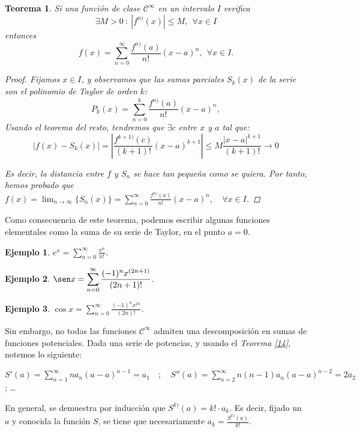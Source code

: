 \documentclass[11pt, a4paper]{article}
\theoremstyle{theorem-style}
\newtheorem{nth}{Teorema}[section]
\theoremstyle{definition-style}
\theoremstyle{remark-style}
\theoremstyle{example-style}
\newtheorem{ejemplo}{Ejemplo}[section]
\begin{document}
\begin{nth} \label{15}
Si una funci\'on de clase $\mathcal{C}^\infty$ en un intervalo $I$ verifica 
\[
\exists M>0 \ : \  |f^{n)}(x)|\leq M, \ \ \forall x\in I
\]
entonces 
\[
f(x) = \sum_{n=0}^\infty \frac{f^{n)} (a)}{n!} (x-a)^n , \ \ \forall x\in I.
\]

\begin{proof}
	Fijamos $x \in I$, y observamos que las sumas parciales $S_k(x)$ de la serie son el polinomio de Taylor de orden $k$: 
\[
P_k(x) =  \sum_{n=0}^k \frac{f^{n)} (a)}{n!} (x-a)^n,
\]
Usando el teorema del resto, tendremos que $\exists c$ entre $x$ y $a$ tal que:
\[
|f(x)-S_k(x)| =\left| \frac{ f^{k+1)} (c)}{(k+1)!} (x-a)^{k+1}\right| \leq  M \frac{|x-a|^{k+1}}{(k+1)!} \to 0
\]

Es decir, la distancia entre $f$ y $S_n$ se hace tan pequeña como se quiera. Por tanto, hemos probado que $\displaystyle f(x) = \lim_{n \to \infty} \{S_n(x)\} = \sum_{n=0}^{\infty} \frac{f^{n)} (a)}{n!} (x-a)^n, \quad \forall x \in I$.
\end{proof}
\end{nth}
Como consecuencia de este teorema, podemos escribir algunas funciones elementales como la suma de su serie de Taylor, en el punto $a = 0$.

\begin{ejemplo}
	$e^x = \displaystyle \sum_{n=0}^\infty  \frac{x^n}{n!}$. 
\end{ejemplo}

\begin{ejemplo}
	$\sen x = \displaystyle \sum_{n=0}^\infty   \frac{(-1)^n x^{(2n+1)}}{(2n+1)!}$.
\end{ejemplo}
\begin{ejemplo}
	$\cos x = \displaystyle \sum_{n=0}^\infty   \frac{(-1)^n x^{2n}}{(2n)!}$.
\end{ejemplo}


Sin embargo, no todas las funciones $\mathcal{C}^{\infty}$ admiten una descomposición en sumas de funciones potenciales. Dada una serie de potencias, y usando el \textit{Teorema \ref{14}}, notemos lo siguiente:

$\displaystyle S'(a) = \sum_{n=1}^{\infty} na_n(a-a)^{n-1} = a_1 \quad ; \quad S''(a) = \sum_{n=2}^{\infty} n(n-1)a_n(a-a)^{n-2} = 2a_2$ \quad ; \quad \dots

En general, se demuestra por inducción que $S^{k)} (a) = k! \cdot a_k$. Es decir, fijado un $a$ y conocida la función $S$, se tiene que necesariamente $a_k = \frac{S^{k)}(a)}{k!}$.
\end{document}
